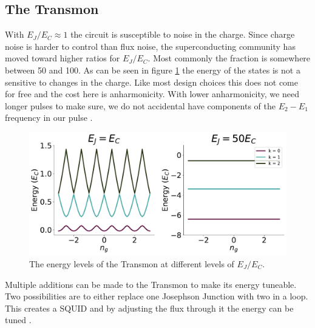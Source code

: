 \subsection{The Transmon}
With $E_J / E_C \approx 1$ the circuit is susceptible to noise in the charge. Since charge noise is harder to control than flux noise, the superconducting community has moved toward higher ratios for $E_J / E_C$. Most commonly the fraction is somewhere between 50 and 100. As can be seen in figure \ref{fig:transmon_charge_sensitivity} the energy of the states is not a sensitive to changes in the charge. Like most design choices this does not come for free and the cost here is  anharmonicity. With lower anharmonicity, we need longer pulses to make sure, we do not accidental have components of the $E_2 - E_1$ frequency in our pulse \cite{koch_charge_2007}. 
\begin{figure}
    \centering
    \includegraphics[]{Figs/Theory/Transmon_energy_vs_ng.pdf}
    \caption{The energy levels of the Transmon at different levels of $E_J / E_C$.}
    \label{fig:transmon_charge_sensitivity}
\end{figure}
Multiple additions can be made to the Transmon to make its energy tuneable. Two possibilities are to either replace one Josephson Junction with two in a loop. This creates a SQUID and by adjusting the flux through it the energy can be tuned \cite{blais_circuit_2021}. 



